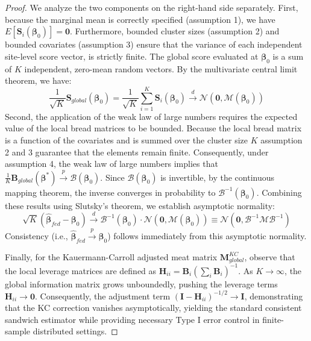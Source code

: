 \documentclass[useAMS,referee, usegraphicx]{biom}
\begin{document}
\begin{proof}
We analyze the two components on the right-hand side separately. First, because the marginal mean is correctly specified (assumption 1), we have $E[\mathbf{S}_i(\boldsymbol{\beta}_0)] = \mathbf{0}$. Furthermore, bounded cluster sizes (assumption 2) and bounded covariates (assumption 3) ensure that the variance of each independent site-level score vector, is strictly finite. The global score evaluated at $\boldsymbol{\beta}_0$ is a sum of $K$ independent, zero-mean random vectors. By the multivariate central limit theorem, we have:
\begin{equation}
    \frac{1}{\sqrt{K}} \mathbf{S}_{global}(\boldsymbol{\beta}_0) = \frac{1}{\sqrt{K}} \sum_{i=1}^K \mathbf{S}_i(\boldsymbol{\beta}_0) \xrightarrow{d} \mathcal{N}(\mathbf{0}, \mathcal{M}(\boldsymbol{\beta}_0))
\end{equation}
Second, the application of the weak law of large numbers requires the expected value of the local bread matrices to be bounded. Because the local bread matrix is a function of the covariates and is summed over the cluster size $K$ assumption 2 and 3  guarantee that the elements remain finite. Consequently, under assumption 4, the weak law of large numbers implies that $\frac{1}{K} \mathbf{B}_{global}(\boldsymbol{\beta}^*) \xrightarrow{p} \mathcal{B}(\boldsymbol{\beta}_0)$. Since $\mathcal{B}(\boldsymbol{\beta}_0)$ is invertible, by the continuous mapping theorem, the inverse converges in probability to $\mathcal{B}^{-1}(\boldsymbol{\beta}_0)$. Combining these results using Slutsky's theorem, we establish asymptotic normality:
\begin{equation}
    \sqrt{K}(\hat{\boldsymbol{\beta}}_{fed} - \boldsymbol{\beta}_0) \xrightarrow{d} \mathcal{B}^{-1}(\boldsymbol{\beta}_0) \cdot \mathcal{N}(\mathbf{0}, \mathcal{M}(\boldsymbol{\beta}_0)) \equiv \mathcal{N}\left(\mathbf{0}, \mathcal{B}^{-1} \mathcal{M} \mathcal{B}^{-1}\right)
\end{equation}
Consistency (i.e., $\hat{\boldsymbol{\beta}}_{fed} \xrightarrow{p} \boldsymbol{\beta}_0$) follows immediately from this asymptotic normality. 

Finally, for the Kauermann-Carroll adjusted meat matrix $\mathbf{M}_{global}^{KC}$, observe that the local leverage matrices are defined as $\mathbf{H}_{ii} = \mathbf{B}_i \left(\sum_i \mathbf{B}_i\right)^{-1}$. As $K \to \infty$, the global information matrix grows unboundedly, pushing the leverage terms $\mathbf{H}_{ii} \to \mathbf{0}$. Consequently, the adjustment term $(\mathbf{I} - \mathbf{H}_{ii})^{-1/2} \to \mathbf{I}$, demonstrating that the KC correction vanishes asymptotically, yielding the standard consistent sandwich estimator while providing necessary Type I error control in finite-sample distributed settings.
\end{proof}
\end{document}
